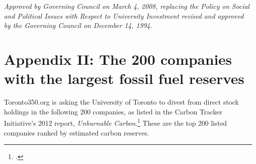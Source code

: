 \documentclass[10pt]{article}
\begin{document}
\emph{Approved by Governing Council on March 4, 2008, replacing the Policy on Social and Political Issues with Respect to University Investment revised and approved by the Governing Council on December 14, 1994.}







\clearpage



		\singlespacing
		\section {Appendix II: The 200 companies with the largest fossil fuel reserves}
		\label{sec:200Companies}
		\doublespacing



Toronto350.org is asking the University of Toronto to divest from direct stock holdings in the following 200 companies, as listed in the Carbon Tracker Initiative's 2012 report, \emph{Unburnable Carbon}.\footcite{CTI2012} 
These are the top 200 listed companies ranked by estimated carbon reserves.
\end{document}
